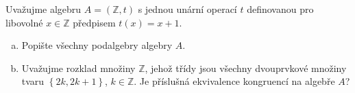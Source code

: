 Uvažujme algebru $A=(\mathbb{Z}, t)$ s jednou unární operací $t$ definovanou pro
libovolné $x \in \mathbb{Z}$ předpisem $t(x) = x+1$.
\begin{enumerate}[a)]
  \item Popište všechny podalgebry algebry $A$.
  \item Uvažujme rozklad množiny $\mathbb{Z}$, jehož třídy jsou všechny
  dvouprvkové množiny tvaru $\left \{ 2k, 2k+1 \right \}$, $k \in \mathbb{Z}$.
  Je příslušná ekvivalence kongruencí na algebře $A$?
\end{enumerate}

